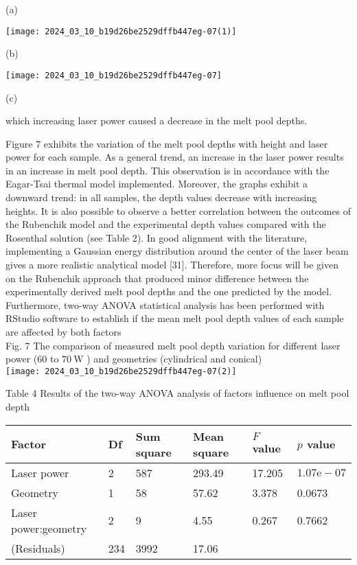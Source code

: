 \documentclass[10pt]{article}
\begin{document}
(a)

\begin{center}
\texttt{[image: 2024\_03\_10\_b19d26be2529dffb447eg-07(1)]}
\end{center}

(b)

\begin{center}
\texttt{[image: 2024\_03\_10\_b19d26be2529dffb447eg-07]}
\end{center}

(c)

which increasing laser power caused a decrease in the melt pool depths.

Figure 7 exhibits the variation of the melt pool depths with height and laser power for each sample. As a general trend, an increase in the laser power results in an increase in melt pool depth. This observation is in accordance with the Eagar-Tsai thermal model implemented. Moreover, the graphs exhibit a downward trend: in all samples, the depth values decrease with increasing heights. It is also possible to observe a better correlation between the outcomes of the Rubenchik model and the experimental depth values compared with the Rosenthal solution (see Table 2). In good alignment with the literature, implementing a Gaussian energy distribution around the center of the laser beam gives a more realistic analytical model [31]. Therefore, more focus will be given on the Rubenchik approach that produced minor difference between the experimentally derived melt pool depths and the one predicted by the model. Furthermore, two-way ANOVA statistical analysis has been performed with RStudio software to establish if the mean melt pool depth values of each sample are affected by both factors\\
Fig. 7 The comparison of measured melt pool depth variation for different laser power (60 to $70 \mathrm{~W}$ ) and geometries (cylindrical and conical)\\
\texttt{[image: 2024\_03\_10\_b19d26be2529dffb447eg-07(2)]}

Table 4 Results of the two-way ANOVA analysis of factors influence on melt pool depth

\begin{center}
\begin{tabular}{llllll}
\hline
Factor & Df & Sum square & Mean square & $F$ value & $p$ value \\
\hline
Laser power & 2 & 587 & 293.49 & 17.205 & $1.07 \mathrm{e}-07$ \\
Geometry & 1 & 58 & 57.62 & 3.378 & 0.0673 \\
Laser power:geometry & 2 & 9 & 4.55 & 0.267 & 0.7662 \\
(Residuals) & 234 & 3992 & 17.06 &  &  \\
\hline
\end{tabular}
\end{center}
\end{document}
